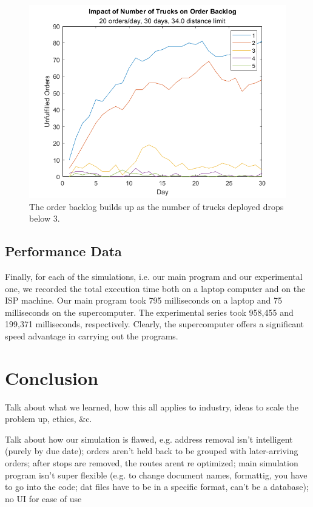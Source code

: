 \documentclass[letterpaper]{article}
\begin{document}
    \begin{figure}[h]
        \centering
        \caption{The order backlog builds up as the number of trucks deployed drops below 3.}
        \label{img:experiment2}
        \includegraphics[width=\textwidth]{experiment2.png}
    \end{figure}

    \subsection{Performance Data}
    \label{subsection:Performance_Data}
    Finally, for each of the simulations, i.e. our main program and our experimental one, we recorded the total execution time both on a laptop computer and on the ISP machine. Our main program took 795 milliseconds on a laptop and 75 milliseconds on the supercomputer. The experimental series took 958,455 and 199,371 milliseconds, respectively. Clearly, the supercomputer offers a significant speed advantage in carrying out the programs.

    \section{Conclusion}
    \label{section:Conclusion}
    Talk about what we learned, how this all applies to industry, ideas to scale the problem up, ethics, \&c.

    Talk about how our simulation is flawed, e.g. address removal isn't intelligent (purely by due date); orders aren't held back to be grouped with later-arriving orders; after stops are removed, the routes arent re optimized; main simulation program isn't super flexible (e.g. to change document names, formattig, you have to go into the code; dat files have to be in a specific format, can't be a database); no UI for ease of use
\end{document}

